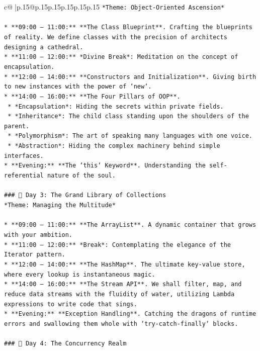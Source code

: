 \documentclass{article}
\begin{document}
{\begin{supertabular}{c@{$\;$}|p{.15\linewidth}@{}p{.15\linewidth}p{.15\linewidth}p{.15\linewidth}p{.15\linewidth}p{.15\linewidth}}
{{{\texttt{*Theme: Object{-}Oriented Ascension*} \\
\\ 
\texttt{*   **09:00 – 11:00:** **The Class Blueprint**. Crafting the blueprints of reality. We define classes with the precision of architects designing a cathedral.} \\
\texttt{*   **11:00 – 12:00:** *Divine Break*: Meditation on the concept of encapsulation.} \\
\texttt{*   **12:00 – 14:00:** **Constructors and Initialization**. Giving birth to new instances with the power of `new`.} \\
\texttt{*   **14:00 – 16:00:** **The Four Pillars of OOP**.} \\
\texttt{    *   *Encapsulation*: Hiding the secrets within private fields.} \\
\texttt{    *   *Inheritance*: The child class standing upon the shoulders of the parent.} \\
\texttt{    *   *Polymorphism*: The art of speaking many languages with one voice.} \\
\texttt{    *   *Abstraction*: Hiding the complex machinery behind simple interfaces.} \\
\texttt{*   **Evening:** **The `this` Keyword**. Understanding the self{-}referential nature of the soul.} \\
\\ 
\texttt{\#\#\# 📅 Day 3: The Grand Library of Collections} \\
\texttt{*Theme: Managing the Multitude*} \\
\\ 
\texttt{*   **09:00 – 11:00:** **The ArrayList**. A dynamic container that grows with your ambition.} \\
\texttt{*   **11:00 – 12:00:** *Break*: Contemplating the elegance of the Iterator pattern.} \\
\texttt{*   **12:00 – 14:00:** **The HashMap**. The ultimate key{-}value store, where every lookup is instantaneous magic.} \\
\texttt{*   **14:00 – 16:00:** **The Stream API**. We shall filter, map, and reduce data streams with the fluidity of water, utilizing Lambda expressions to write code that sings.} \\
\texttt{*   **Evening:** **Exception Handling**. Catching the dragons of runtime errors and swallowing them whole with `try{-}catch{-}finally` blocks.} \\
\\ 
\texttt{\#\#\# 📅 Day 4: The Concurrency Realm} \\
}}}
\end{supertabular}}
\end{document}

